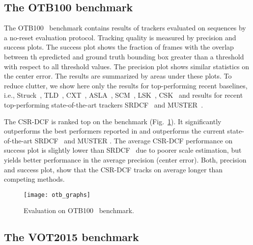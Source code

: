 \documentclass[twocolumn]{article}
\begin{document}
\subsection{The OTB100 benchmark~\citep{otb_pami2015}} \label{sec:otb_2015}

The OTB100~\citep{otb_pami2015} benchmark contains results of  trackers evaluated on  sequences by a no-reset evaluation protocol. Tracking quality is measured by precision and success plots. The success plot shows the fraction of frames with the overlap between th epredicted and ground truth bounding box greater than a threshold with respect to all threshold values. The precision plot shows similar statistics on the center error. The results are summarized by areas under these plots. To reduce clutter, we show here only the results for top-performing recent baselines, i.e., Struck~\citep{hare_struck}, TLD~\citep{kalal_pami}, CXT~\citep{cxt_cvpr2011}, ASLA~\citep{asla_cvpr2012}, SCM~\citep{scm_cvpr2012}, LSK~\citep{lsk_cvpr2011}, CSK~\citep{csk_henriques_eccv2012} and results for recent top-performing state-of-the-art trackers SRDCF~\citep{srdcf_iccv2015} and MUSTER~\citep{muster_cvpr2015}.

The CSR-DCF is ranked top on the benchmark (Fig.~\ref{fig:otb_graphs}). It significantly outperforms the best performers reported in \citep{otb_pami2015} and outperforms the current state-of-the-art SRDCF~\citep{srdcf_iccv2015} and MUSTER \citep{muster_cvpr2015}. The average CSR-DCF performance on success plot is slightly lower than SRDCF~\citep{srdcf_iccv2015} due to poorer scale estimation, but yields better performance in the average precision (center error). Both, precision and success plot, show that the CSR-DCF tracks on average longer than competing methods.

\begin{figure}
\centering   
\texttt{[image: otb\_graphs]}
\caption{Evaluation on OTB100~\citep{otb_pami2015} benchmark.}
\label{fig:otb_graphs}
\end{figure}

\subsection{The VOT2015 benchmark~\citep{kristan_vot2015}} \label{sec:vot_2015} 
\end{document}
